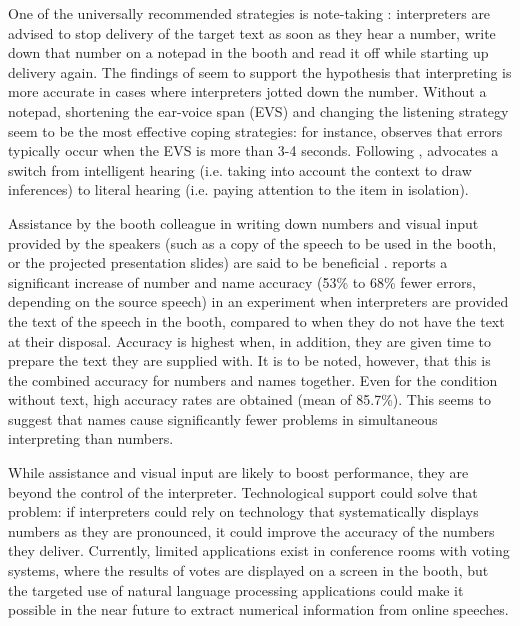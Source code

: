 \documentclass[output=paper]{langsci/langscibook}
\begin{document}
One of the universally recommended strategies is note-taking \citep{Setton1999,Jones2002,Mead2015}: interpreters are advised to stop delivery of the target text as soon as they hear a number, write down that number on a notepad in the booth and read it off while starting up delivery again. The findings of \citet{Mazza2001} seem to support the hypothesis that interpreting is more accurate in cases where interpreters jotted down the number. Without a notepad, shortening the ear-voice span (\textsc{EVS}) and changing the listening strategy seem to be the most effective coping strategies: \citet{Setton1999} for instance, observes that errors typically occur when the EVS is more than 3-4 seconds. Following \citet{Seleskovitch1975}, \citet{Pinochi2009} advocates a switch from intelligent hearing (i.e. taking into account the context to draw inferences) to literal hearing (i.e. paying attention to the item in isolation).

Assistance by the booth colleague in writing down numbers and visual input provided by the speakers (such as a copy of the speech to be used in the booth, or the projected presentation slides) are said to be beneficial \citep{Mead2015}. \citet{Lamberger-Felber2001} reports a significant increase of number and name accuracy (53\% to 68\% fewer errors, depending on the source speech) in an experiment when interpreters are provided the text of the speech in the booth, compared to when they do not have the text at their disposal. Accuracy is highest when, in addition, they are given time to prepare the text they are supplied with. It is to be noted, however, that this is the combined accuracy for numbers and names together. Even for the condition without text, high accuracy rates are obtained (mean of 85.7\%). This seems to suggest that names cause significantly fewer problems in simultaneous interpreting than numbers.

While assistance and visual input are likely to boost performance, they are beyond the control of the interpreter. Technological support could solve that problem: if interpreters could rely on technology that systematically displays numbers as they are pronounced, it could improve the accuracy of the numbers they deliver. Currently, limited applications exist in conference rooms with voting systems, where the results of votes are displayed on a screen in the booth, but the targeted use of natural language processing applications could make it possible in the near future to extract numerical information from online speeches. 
\end{document}
